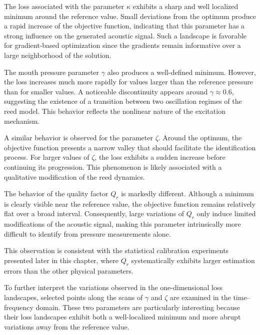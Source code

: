 \documentclass[11pt,a4paper]{report}
\theoremstyle{plain}
\theoremstyle{definition}
\begin{document}
The loss associated with the parameter $\kappa$ exhibits a sharp and well
localized minimum around the reference value. Small deviations from the optimum
produce a rapid increase of the objective function, indicating that this
parameter has a strong influence on the generated acoustic signal. Such a
landscape is favorable for gradient-based optimization since the gradients
remain informative over a large neighborhood of the solution.

The mouth pressure parameter $\gamma$ also produces a well-defined minimum.
However, the loss increases much more rapidly for values larger than the
reference pressure than for smaller values. A noticeable discontinuity appears
around $\gamma \approx 0.6$, suggesting the existence of a transition between
two oscillation regimes of the reed model. This behavior reflects the
nonlinear nature of the excitation mechanism.

A similar behavior is observed for the parameter $\zeta$. Around the optimum,
the objective function presents a narrow valley that should facilitate the
identification process. For larger values of $\zeta$, the loss exhibits a
sudden increase before continuing its progression. This phenomenon is likely
associated with a qualitative modification of the reed dynamics.

The behavior of the quality factor $Q_r$ is markedly different. Although a
minimum is clearly visible near the reference value, the objective function
remains relatively flat over a broad interval. Consequently, large variations
of $Q_r$ only induce limited modifications of the acoustic signal, making this
parameter intrinsically more difficult to identify from pressure measurements
alone.

This observation is consistent with the statistical calibration experiments
presented later in this chapter, where $Q_r$ systematically exhibits larger
estimation errors than the other physical parameters.


To further interpret the variations observed in the one-dimensional loss
landscapes, selected points along the scans of $\gamma$ and $\zeta$ are
examined in the time--frequency domain. These two parameters are particularly
interesting because their loss landscapes exhibit both a well-localized
minimum and more abrupt variations away from the reference value.
\end{document}
